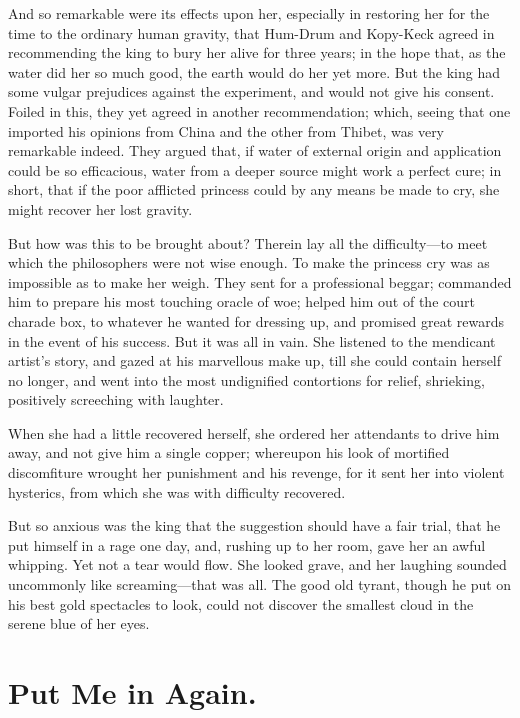 \documentclass[12pt]{memoir}
\begin{document}
And so remarkable were its effects upon her, especially in restoring
her for the time to the ordinary human gravity, that Hum-Drum and
Kopy-Keck agreed in recommending the king to bury her alive for three
years; in the hope that, as the water did her so much good, the earth
would do her yet more.  But the king had some vulgar prejudices
against the experiment, and would not give his consent.  Foiled in
this, they yet agreed in another recommendation; which, seeing that
one imported his opinions from China and the other from Thibet, was
very remarkable indeed.  They argued that, if water of external origin
and application could be so efficacious, water from a deeper source
might work a perfect cure; in short, that if the poor afflicted
princess could by any means be made to cry, she might recover her lost
gravity.

But how was this to be brought about?  Therein lay all the
difficulty---to meet which the philosophers were not wise enough.  To
make the princess cry was as impossible as to make her weigh.  They
sent for a professional beggar; commanded him to prepare his most
touching oracle of woe; helped him out of the court charade box, to
whatever he wanted for dressing up, and promised great rewards in the
event of his success.  But it was all in vain.  She listened to the
mendicant artist's story, and gazed at his marvellous make up, till
she could contain herself no longer, and went into the most
undignified contortions for relief, shrieking, positively screeching
with laughter.

When she had a little recovered herself, she ordered her attendants to
drive him away, and not give him a single copper; whereupon his look
of mortified discomfiture wrought her punishment and his revenge, for
it sent her into violent hysterics, from which she was with difficulty
recovered.

But so anxious was the king that the suggestion should have a fair
trial, that he put himself in a rage one day, and, rushing up to her
room, gave her an awful whipping.  Yet not a tear would flow.  She
looked grave, and her laughing sounded uncommonly like
screaming---that was all.  The good old tyrant, though he put on his
best gold spectacles to look, could not discover the smallest cloud in
the serene blue of her eyes.


\chapter{Put Me in Again.}
\end{document}
